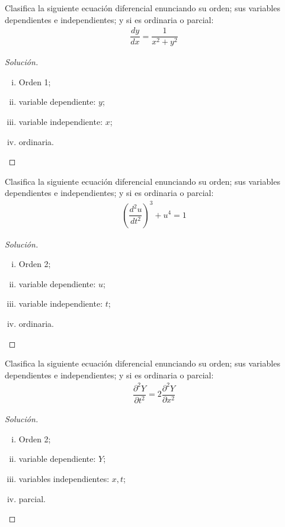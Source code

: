 \begin{resuelto}
	Clasifica la siguiente ecuación diferencial enunciando su orden; sus variables dependientes e independientes; y si es ordinaria o parcial:
\begin{align}
	\dfrac{dy}{dx}= \dfrac{1}{x^{2}+y^{2}}
\end{align}
\end{resuelto}
\begin{proof}[Solución]
	\begin{enumerate}[(i)]
		\item Orden 1;
		\item variable dependiente: $ y $;
		\item variable independiente: $ x $;
		\item ordinaria.
	\end{enumerate}
\end{proof}


\begin{resuelto}
	Clasifica la siguiente ecuación diferencial enunciando su orden; sus variables dependientes e independientes; y si es ordinaria o parcial:
\begin{align}
	\left(\dfrac{d^{2}u}{dt^{2}}\right)^{3}+u^{4}=1
\end{align}
\end{resuelto}
\begin{proof}[Solución]
	\begin{enumerate}[(i)]
		\item Orden 2;
		\item variable dependiente: $ u $;
		\item variable independiente: $ t $;
		\item ordinaria.
	\end{enumerate}
\end{proof}



\begin{resuelto}
	Clasifica la siguiente ecuación diferencial enunciando su orden; sus variables dependientes e independientes; y si es ordinaria o parcial:
\begin{align}
	\dfrac{\partial^{2}Y}{\partial t^{2}} = 2\dfrac{\partial^{2}Y}{\partial x^{2}}
\end{align}
\end{resuelto}
\begin{proof}[Solución]
	\begin{enumerate}[(i)]
		\item Orden 2;
		\item variable dependiente: $ Y $;
		\item variables independientes: $ x,t $;
		\item parcial.
	\end{enumerate}
\end{proof}



